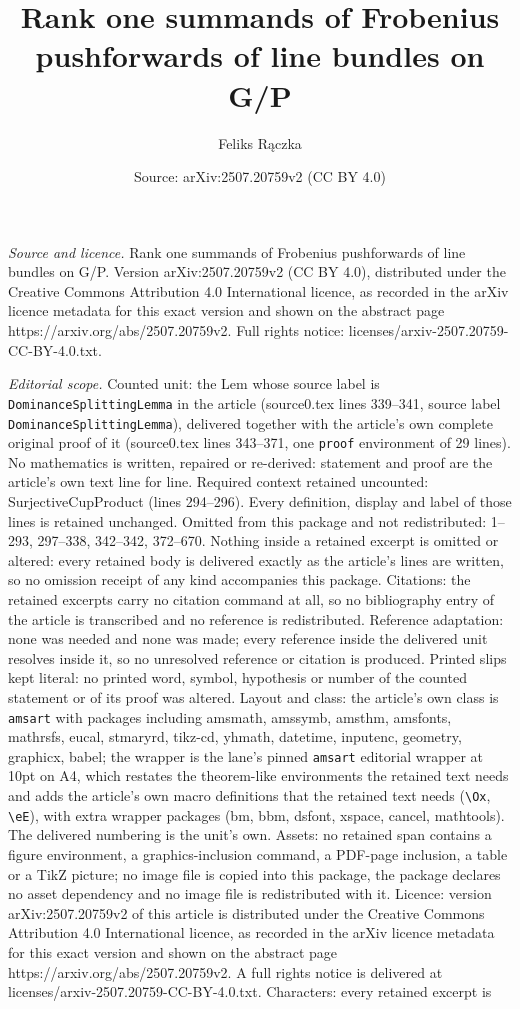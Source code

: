 \documentclass[10pt,a4paper]{amsart}
\title[Rank one summands of Frobenius pushforwards of line bundles ]{Rank one summands of Frobenius pushforwards of line bundles on G/P}
\author{Feliks R\k{a}czka}
\date{Source: arXiv:2507.20759v2 (CC BY 4.0)}
\begin{document}
\maketitle

\noindent\emph{Source and licence.} Rank one summands of Frobenius pushforwards of line bundles on G/P. Version arXiv:2507.20759v2 (CC BY 4.0), distributed under the Creative Commons Attribution 4.0 International licence, as recorded in the arXiv licence metadata for this exact version and shown on the abstract page https://arxiv.org/abs/2507.20759v2. Full rights notice: licenses/arxiv-2507.20759-CC-BY-4.0.txt.\par\smallskip

\noindent\textit{Editorial scope.} Counted unit: the Lem whose source label is \texttt{DominanceSplittingLemma} in the article (source0.tex lines 339--341, source label \texttt{DominanceSplittingLemma}), delivered together with the article's own complete original proof of it (source0.tex lines 343--371, one \texttt{proof} environment of 29 lines). No mathematics is written, repaired or re-derived: statement and proof are the article's own text line for line. Required context retained uncounted: SurjectiveCupProduct (lines 294--296). Every definition, display and label of those lines is retained unchanged. Omitted from this package and not redistributed: 1--293, 297--338, 342--342, 372--670. Nothing inside a retained excerpt is omitted or altered: every retained body is delivered exactly as the article's lines are written, so no omission receipt of any kind accompanies this package. Citations: the retained excerpts carry no citation command at all, so no bibliography entry of the article is transcribed and no reference is redistributed. Reference adaptation: none was needed and none was made; every reference inside the delivered unit resolves inside it, so no unresolved reference or citation is produced. Printed slips kept literal: no printed word, symbol, hypothesis or number of the counted statement or of its proof was altered. Layout and class: the article's own class is \texttt{amsart} with packages including amsmath, amssymb, amsthm, amsfonts, mathrsfs, eucal, stmaryrd, tikz-cd, yhmath, datetime, inputenc, geometry, graphicx, babel; the wrapper is the lane's pinned \texttt{amsart} editorial wrapper at 10pt on A4, which restates the theorem-like environments the retained text needs and adds the article's own macro definitions that the retained text needs (\texttt{\textbackslash Ox}, \texttt{\textbackslash eE}), with extra wrapper packages (bm, bbm, dsfont, xspace, cancel, mathtools). The delivered numbering is the unit's own. Assets: no retained span contains a figure environment, a graphics-inclusion command, a PDF-page inclusion, a table or a TikZ picture; no image file is copied into this package, the package declares no asset dependency and no image file is redistributed with it. Licence: version arXiv:2507.20759v2 of this article is distributed under the Creative Commons Attribution 4.0 International licence, as recorded in the arXiv licence metadata for this exact version and shown on the abstract page https://arxiv.org/abs/2507.20759v2. A full rights notice is delivered at licenses/arxiv-2507.20759-CC-BY-4.0.txt. Characters: every retained excerpt is 
\end{document}
